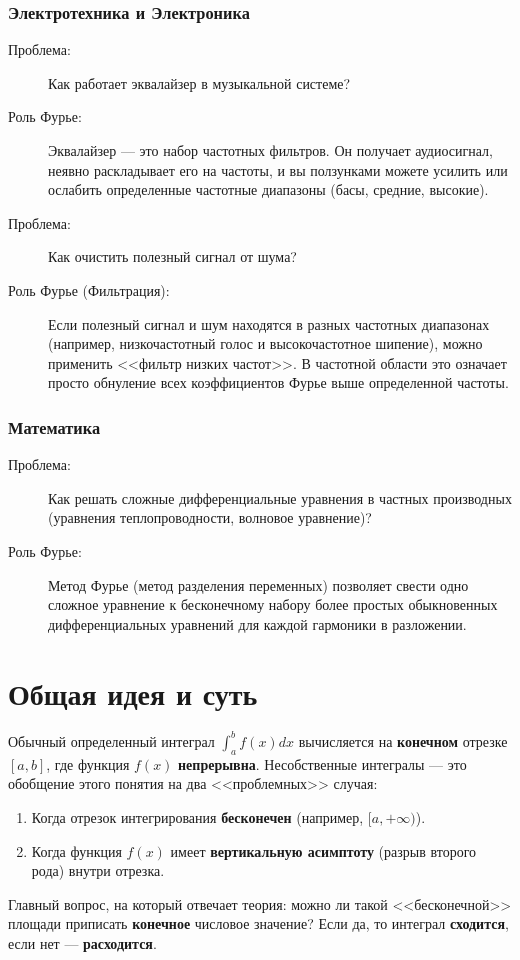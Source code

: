 \documentclass[a4paper, 12pt]{report}
\numberwithin{equation}{section}
\begin{document}
\subsubsection{Электротехника и Электроника}
\begin{description}
	\item[Проблема:] Как работает эквалайзер в музыкальной системе?
	\item[Роль Фурье:] Эквалайзер — это набор частотных фильтров. Он получает аудиосигнал, неявно раскладывает его на частоты, и вы ползунками можете усилить или ослабить определенные частотные диапазоны (басы, средние, высокие).
	
	\item[Проблема:] Как очистить полезный сигнал от шума?
	\item[Роль Фурье (Фильтрация):] Если полезный сигнал и шум находятся в разных частотных диапазонах (например, низкочастотный голос и высокочастотное шипение), можно применить <<фильтр низких частот>>. В частотной области это означает просто обнуление всех коэффициентов Фурье выше определенной частоты.
\end{description}

\subsubsection{Математика}
\begin{description}
	\item[Проблема:] Как решать сложные дифференциальные уравнения в частных производных (уравнения теплопроводности, волновое уравнение)?
	\item[Роль Фурье:] Метод Фурье (метод разделения переменных) позволяет свести одно сложное уравнение к бесконечному набору более простых обыкновенных дифференциальных уравнений для каждой гармоники в разложении.
\end{description}

\section{Общая идея и суть}

Обычный определенный интеграл $\int_{a}^{b} f(x) dx$ вычисляется на \textbf{конечном} отрезке $[a,b]$, где функция $f(x)$ \textbf{непрерывна}. Несобственные интегралы — это обобщение этого понятия на два <<проблемных>> случая:
\begin{enumerate}
	\item Когда отрезок интегрирования \textbf{бесконечен} (например, $[a, +\infty)$).
	\item Когда функция $f(x)$ имеет \textbf{вертикальную асимптоту} (разрыв второго рода) внутри отрезка.
\end{enumerate}
Главный вопрос, на который отвечает теория: можно ли такой <<бесконечной>> площади приписать \textbf{конечное} числовое значение? Если да, то интеграл \textbf{сходится}, если нет — \textbf{расходится}.
\end{document}
